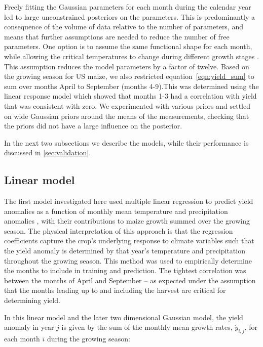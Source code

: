 \documentclass[12pt]{iopart}
\newcommand{\remove}[1]{}
\newcommand{\add}[1]{#1}
\begin{document}
Freely fitting the Gaussian parameters for each month during the calendar year led to large unconstrained posteriors on the parameters. This is predominantly a consequence of the\remove{ self-imposed limited} volume of data relative to the number of parameters, and means that further assumptions are needed to reduce the number of free parameters. One option is to assume the same functional shape for each month, while allowing the critical temperatures to change during different growth stages \citep[e.g.][]{hatfield:2011, sanchez:2014}. This assumption reduces the model parameters by a factor of twelve. Based on the growing season for US maize, we also restricted equation~\ref{eqn:yield_sum} to sum over months April to September (months 4-9).\remove{, which are the most highly correlated with yield.}\add{This was determined using the linear response model which showed that months 1-3 had a correlation with yield that was consistent with zero.} We experimented with various priors and settled on wide Gaussian priors around the means of the measurements, checking that the priors did not have a large influence on the posterior.

In the next two subsections we describe the models, while their performance is discussed in \ref{sec:validation}.

\subsection{Linear model}
\label{sec:appendix_linear}

\remove{As stated above, the}\add{The} first model investigated here used multiple linear regression to predict yield anomalies as a function of monthly mean temperature and precipitation anomalies \add{, with their contributions to maize growth summed over the growing season}. The physical interpretation of this approach is that the regression coefficients capture the crop's underlying response to climate variables such that the yield anomaly is determined by that year's temperature and precipitation throughout the growing season. This method was used to empirically determine the months to include in training and prediction. The tightest correlation was between the months of April and September -- as expected under the assumption that the months leading up to and including the harvest are critical for determining yield.

In this linear model\add{ and the later two dimensional Gaussian model}, the yield anomaly in year $j$ is given by the sum of the monthly mean growth rates, $\dot{y}_{i,j}$, for each month $i$ during the growing season:
\end{document}
